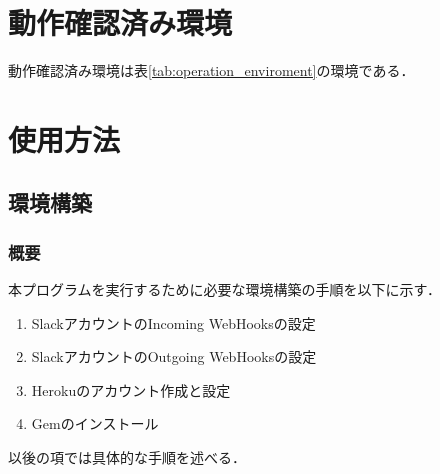 \documentclass[fleqn, 14pt]{extarticlej}
\begin{document}
\begin{table}[bt]
  \begin{center}
    \caption{動作環境}
    \label{tab:operation_enviroment}
    \vspace{0.3cm}
  \end{center}
\end{table}

   
\section{動作確認済み環境}
\label{sec:condirmed_enviroment}
動作確認済み環境は表\ref{tab:operation_enviroment}の環境である．

\section{使用方法}
\label{usage}


\subsection{環境構築}
\label{sec:enviroment_construction}
\subsubsection{概要}
本プログラムを実行するために必要な環境構築の手順を以下に示す．
\begin{enumerate}
\item SlackアカウントのIncoming WebHooksの設定
\item SlackアカウントのOutgoing WebHooksの設定
\item Herokuのアカウント作成と設定
\item Gemのインストール
\end{enumerate}
以後の項では具体的な手順を述べる．
\end{document}
